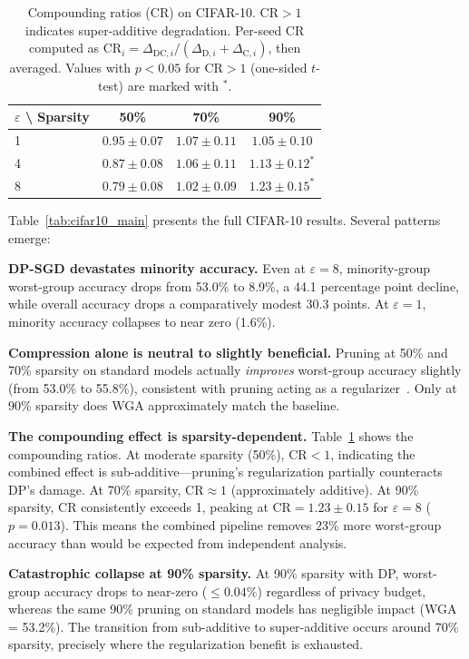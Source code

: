 \documentclass{article}
\newcommand{\CR}{\text{CR}}
\begin{document}
\begin{table}[t]
\caption{Compounding ratios ($\CR$) on CIFAR-10. $\CR > 1$ indicates super-additive degradation. Per-seed CR computed as $\CR_i = \Delta_{\text{DC},i} / (\Delta_{\text{D},i} + \Delta_{\text{C},i})$, then averaged. Values with $p < 0.05$ for $\CR > 1$ (one-sided $t$-test) are marked with $^*$.}
\label{tab:cr_cifar10}
\centering
\small
\begin{tabular}{lccc}
\toprule
$\varepsilon$ \textbackslash{} Sparsity & 50\% & 70\% & 90\% \\
\midrule
1 & $0.95 \pm 0.07$ & $1.07 \pm 0.11$ & $1.05 \pm 0.10$ \\
4 & $0.87 \pm 0.08$ & $1.06 \pm 0.11$ & $\mathbf{1.13 \pm 0.12}^*$ \\
8 & $0.79 \pm 0.08$ & $1.02 \pm 0.09$ & $\mathbf{1.23 \pm 0.15}^*$ \\
\bottomrule
\end{tabular}
\end{table}


Table~\ref{tab:cifar10_main} presents the full CIFAR-10 results. Several patterns emerge:

\textbf{DP-SGD devastates minority accuracy.} Even at $\varepsilon = 8$, minority-group worst-group accuracy drops from 53.0\% to 8.9\%, a 44.1 percentage point decline, while overall accuracy drops a comparatively modest 30.3 points. At $\varepsilon = 1$, minority accuracy collapses to near zero (1.6\%).

\textbf{Compression alone is neutral to slightly beneficial.} Pruning at 50\% and 70\% sparsity on standard models actually \emph{improves} worst-group accuracy slightly (from 53.0\% to 55.8\%), consistent with pruning acting as a regularizer~\citep{hooker2020characterising}. Only at 90\% sparsity does WGA approximately match the baseline.

\textbf{The compounding effect is sparsity-dependent.} Table~\ref{tab:cr_cifar10} shows the compounding ratios. At moderate sparsity (50\%), $\CR < 1$, indicating the combined effect is sub-additive---pruning's regularization partially counteracts DP's damage. At 70\% sparsity, $\CR \approx 1$ (approximately additive). At 90\% sparsity, $\CR$ consistently exceeds 1, peaking at $\CR = 1.23 \pm 0.15$ for $\varepsilon = 8$ ($p = 0.013$). This means the combined pipeline removes 23\% more worst-group accuracy than would be expected from independent analysis.

\textbf{Catastrophic collapse at 90\% sparsity.} At 90\% sparsity with DP, worst-group accuracy drops to near-zero (${\leq}0.04\%$) regardless of privacy budget, whereas the same 90\% pruning on standard models has negligible impact (WGA = 53.2\%). The transition from sub-additive to super-additive occurs around 70\% sparsity, precisely where the regularization benefit is exhausted.
\end{document}
